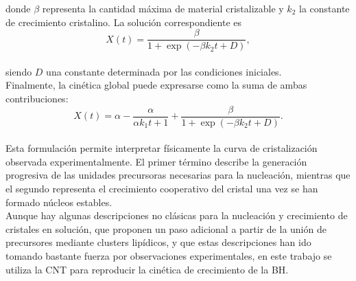 \documentclass[12pt,letterpaper,oneside]{report}
\begin{document}
\noindent donde $\beta$ representa la cantidad máxima de material cristalizable y $k_{2}$ la constante de crecimiento cristalino. La solución correspondiente es\\

\begin{equation}
X(t)
=
\frac{\beta}
{1+\exp\left(-\beta k_{2} t + D\right)},
\label{eq:sol_logistica}
\end{equation}\\

\noindent siendo $D$ una constante determinada por las condiciones iniciales.\\

Finalmente, la cinética global puede expresarse como la suma de ambas contribuciones:\\

\begin{equation}
X(t)
=
\alpha
-
\frac{\alpha}
{\alpha k_{1} t+1}
+
\frac{\beta}
{1+\exp\left(-\beta k_{2} t+D\right)}.
\label{eq:modelo_global}
\end{equation}\\

Esta formulación permite interpretar físicamente la curva de cristalización observada experimentalmente. El primer término describe la generación progresiva de las unidades precursoras necesarias para la nucleación, mientras que el segundo representa el crecimiento cooperativo del cristal una vez se han formado núcleos estables.\\

Aunque hay algunas descripciones no clásicas para la nucleación y crecimiento de cristales en solución, que proponen un paso adicional a partir de la unión de precursores mediante clusters lipídicos, y que estas descripciones han ido tomando bastante fuerza por observaciones experimentales, en este trabajo se utiliza la CNT para reproducir la cinética de crecimiento de la BH.\\


\end{document}
